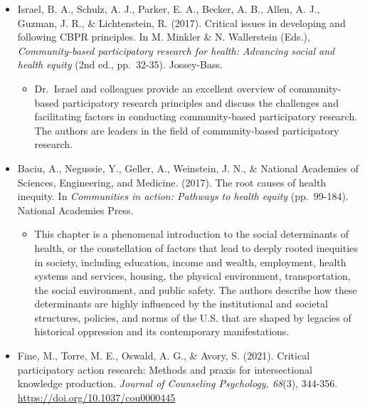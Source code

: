 \documentclass[
  11pt,
]{book}
\providecommand{\tightlist}{%
  \setlength{\itemsep}{0pt}\setlength{\parskip}{0pt}}
\begin{document}
\begin{itemize}
\tightlist
\item
  Israel, B. A., Schulz, A. J., Parker, E. A., Becker, A. B., Allen, A. J., Guzman, J. R., \& Lichtenstein, R. (2017). Critical issues in developing and following CBPR principles. In M. Minkler \& N. Wallerstein (Eds.), \emph{Community-based participatory research for health: Advancing social and health equity} (2nd ed., pp.~32-35). Jossey-Bass.

  \begin{itemize}
  \tightlist
  \item
    Dr.~Israel and colleagues provide an excellent overview of community-based participatory research principles and discuss the challenges and facilitating factors in conducting community-based participatory research. The authors are leaders in the field of community-based participatory research.
  \end{itemize}
\item
  Baciu, A., Negussie, Y., Geller, A., Weinstein, J. N., \& National Academies of Sciences, Engineering, and Medicine. (2017). The root causes of health inequity. In \emph{Communities in action: Pathways to health equity} (pp.~99-184). National Academies Press.

  \begin{itemize}
  \tightlist
  \item
    This chapter is a phenomenal introduction to the social determinants of health, or the constellation of factors that lead to deeply rooted inequities in society, including education, income and wealth, employment, health systems and services, housing, the physical environment, transportation, the social environment, and public safety. The authors describe how these determinants are highly influenced by the institutional and societal structures, policies, and norms of the U.S. that are shaped by legacies of historical oppression and its contemporary manifestations.
  \end{itemize}
\item
  Fine, M., Torre, M. E., Oswald, A. G., \& Avory, S. (2021). Critical participatory action research: Methods and praxis for intersectional knowledge production. \emph{Journal of Counseling Psychology, 68}(3), 344-356. \url{https://doi.org/10.1037/cou0000445}


\end{itemize}
\end{document}
